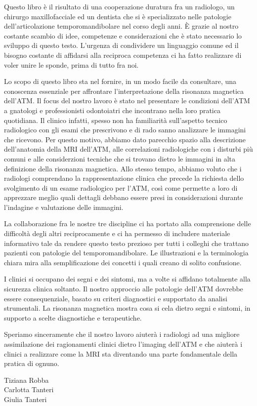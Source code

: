 \documentclass[leqno,10pt,twocolumn,a4paper]{article}
\begin{document}
	\vspace*{0.5cm}
	Questo libro è il risultato di una cooperazione duratura fra un radiologo, un chirurgo maxillofacciale ed un dentista che si è specializzato nelle patologie dell'articolazione temporomandibolare nel corso degli anni. È grazie al nostro costante scambio
	di idee, competenze e considerazioni che è stato necessario lo sviluppo di questo testo. L'urgenza di condividere un linguaggio comune ed il bisogno costante di affidarsi alla reciproca competenza ci ha fatto realizzare di voler unire le sponde, 
	prima di tutto fra noi. \par Lo scopo di questo libro sta nel fornire, in un modo facile da consultare, una conoscenza essenziale per affrontare l'interpretazione della risonanza magnetica dell'ATM. Il focus del nostro lavoro è stato nel presentare
	le condizioni dell'ATM a gnatologi e professionisti odontoiatri che incontrano nella loro pratica quotidiana. Il clinico infatti, spesso non ha familiarità sull'aspetto tecnico radiologico con gli esami che prescrivono e di rado sanno analizzare le 
	immagini che ricevono. Per questo motivo, abbiamo dato parecchio spazio alla descrizione dell'anatomia della MRI dell'ATM, alle correlazioni radiologiche con i disturbi più comuni e alle considerzioni tecniche che si trovano dietro le immagini in 
	alta definizione della risonanza magnetica. Allo stesso tempo, abbiamo voluto che i radiologi comprendano la rappresentazione clinica che precede la richiesta dello svolgimento di un esame radiologico per l'ATM, così come permette a loro di
	apprezzare meglio quali dettagli debbano essere presi in considerazioni durante l'indagine e valutazione delle immagini. \par La collaborazione fra le nostre tre discipline ci ha portato alla comprensione delle difficoltà degli altri reciprocamente 
	e ci ha permesso di includere materiale informativo tale da rendere questo testo prezioso per tutti i colleghi che trattano pazienti con patologie del temporomandibolare. Le illustrazioni e la terminologia chiara mira alla semplificazione dei 
	concetti i quali creano di solito confusione. \par I clinici si occupano dei segni e dei sintomi, ma a volte si affidano totalmente alla sicurezza clinica soltanto. Il nostro approccio alle patologie dell'ATM dovrebbe essere consequenziale, basato 
	su criteri diagnostici e supportato da analisi strumentali. La risonanza magnetica mostra cosa si cela dietro segni e sintomi, in supporto a scelte diagnostiche e terapeutiche. \par Speriamo sinceramente che il nostro lavoro aiuterà i radiologi
	ad una migliore assimilazione dei ragionamenti clinici dietro l'imaging dell'ATM e che aiuterà i clinici a realizzare come la MRI sta diventando una parte fondamentale della pratica di ognuno.
	\begin{flushright}
		Tiziana Robba\\ Carlotta Tanteri \\ Giulia Tanteri
	\end{flushright}
	
\end{document}
